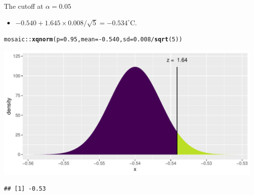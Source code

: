 \documentclass[10pt]{beamer}\usepackage[]{graphicx}\usepackage[]{color}
\makeatletter
\def\maxwidth{ %
  \ifdim\Gin@nat@width>\linewidth
    \linewidth
  \else
    \Gin@nat@width
  \fi
}
\newcommand{\hlnum}[1]{\textcolor[rgb]{0.686,0.059,0.569}{#1}}%
\newcommand{\hlopt}[1]{\textcolor[rgb]{0,0,0}{#1}}%
\newcommand{\hlstd}[1]{\textcolor[rgb]{0.345,0.345,0.345}{#1}}%
\newcommand{\hlkwc}[1]{\textcolor[rgb]{0.333,0.667,0.333}{#1}}%
\newcommand{\hlkwd}[1]{\textcolor[rgb]{0.737,0.353,0.396}{\textbf{#1}}}%
\newenvironment{kframe}{%
 \def\at@end@of@kframe{}%
 \ifinner\ifhmode%
  \def\at@end@of@kframe{\end{minipage}}%
  \begin{minipage}{\columnwidth}%
 \fi\fi%
 \def\FrameCommand##1{\hskip\@totalleftmargin \hskip-\fboxsep
 \colorbox{shadecolor}{##1}\hskip-\fboxsep
     \hskip-\linewidth \hskip-\@totalleftmargin \hskip\columnwidth}%
 \MakeFramed {\advance\hsize-\width
   \@totalleftmargin\z@ \linewidth\hsize
   \@setminipage}}%
 {\par\unskip\endMakeFramed%
 \at@end@of@kframe}
\newenvironment{knitrout}{}{} %
\makeatother
\begin{document}
\begin{frame}[fragile]{The cutoff at $\alpha = 0.05$}
	\begin{itemize}
		\item $-0.540 + 1.645 \times 0.008/\sqrt{5}  = -0.534^{\circ}\textrm{C}.$
	\end{itemize}
	
\begin{knitrout}\tiny
{}\color{fgcolor}\begin{kframe}
\begin{alltt}
\hlstd{mosaic}\hlopt{::}\hlkwd{xqnorm}\hlstd{(}\hlkwc{p} \hlstd{=} \hlnum{0.95}\hlstd{,} \hlkwc{mean} \hlstd{=} \hlopt{-}\hlnum{0.540}\hlstd{,} \hlkwc{sd} \hlstd{=} \hlnum{0.008}\hlopt{/}\hlkwd{sqrt}\hlstd{(}\hlnum{5}\hlstd{))}
\end{alltt}
\end{kframe}

{\centering \includegraphics[width=\maxwidth]{figure/unnamed-chunk-6-1} 

}


\begin{kframe}\begin{verbatim}
## [1] -0.53
\end{verbatim}
\end{kframe}
\end{knitrout}
\end{frame}
\end{document}
